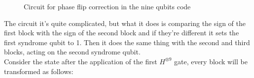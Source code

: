 \documentclass{article}
\begin{document}
	\begin{figure}[H]
	\centering
	\caption{Circuit for phase flip correction in the nine qubits code}
	\end{figure}
	\noindent The circuit it's quite complicated, but what it does is comparing the sign of the first block with the sign of the second block and if they're different it sets the first syndrome qubit to 1. Then it does the same thing with the second and third blocks, acting on the second syndrome qubit.\\
	Consider the state after the application of the first $H^{\otimes 9}$ gate, every block will be transformed as follows:
\end{document}
